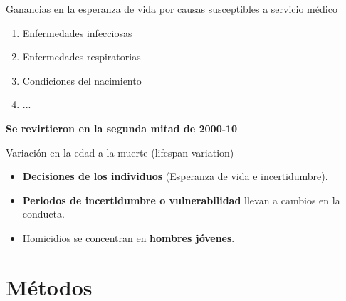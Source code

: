 \documentclass[xcolor={dvipsnames}]{beamer}
\begin{document}
\begin{frame}

\LARGE{
Ganancias en la esperanza de vida por causas susceptibles a servicio m\'edico

\begin{enumerate}
\item Enfermedades infecciosas
\item Enfermedades respiratorias
\item Condiciones del nacimiento
\item ...
\end{enumerate}

 \pause
\begin{center}
\textbf{Se revirtieron en la segunda mitad de 2000-10}
\end{center}				

}
\end{frame}


\begin{frame}
\Large{
Variaci\'on en la edad a la muerte (lifespan variation)
\pause
		\begin{itemize}
		
		\item \textbf{Decisiones de los individuos} (Esperanza de vida e incertidumbre). \pause

		\item \textbf{Periodos de incertidumbre o vulnerabilidad} llevan a cambios en la conducta. \pause
		
		\item Homicidios se concentran en \textbf{hombres j\'ovenes}. \pause
						
		\end{itemize}

}
\end{frame}

\section{M\'etodos}
\end{document}
